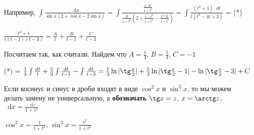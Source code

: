 \documentclass{article}
\newcommand*\diff{\mathop{}\!\mathrm{d}}
\begin{document}
\hfill

Например, $\int \frac{\diff x}{\sin x (2 + \cos x - 2 \sin x)} = \int \frac{\frac{2 \diff t}{1 + t^2}}{\frac{2t}{1 + t^2} (2 + \frac{1 - t^2}{1 + t^2} - \frac{2 * 2 t}{1 + t^2})} = \int \frac{(t^2 + 1) \diff t}{t (t^2 - 4t + 3)}$ = (*)

$\frac{t^2 + 1}{t(t - 1)(t - 3)} = \frac{A}{t} + \frac{B}{t - 1} + \frac{C}{t - 3}$

Посчитаем так, как считали. Найдем что $A = \frac{1}{3}$, $B = \frac{5}{3}$, $C = -1$

(*) = $\frac{1}{3} \int \frac{\diff t}{t} + \frac{5}{3} \int \frac{\diff t}{t - 1} - \int \frac{\diff t}{t - 3} = \frac{1}{3} \ln |\tg \frac{x}{2}| + \frac{5}{3} \ln |\tg \frac{x}{2} - 1| - \ln |\tg \frac{x}{2} - 3| + C$

\hfill

Если косинус и синус в дроби входят в виде $\cos^2 x$ и $\sin^2 x$, то мы можем делать замену не универсальную, а \textbf{обозначать} $\tg x = z$, $x = \arctg z$, $\diff x = \frac{\diff z}{1 + z^2}$

$\cos^2 x = \frac{1}{1 + t^2}$, $\sin^2 x = \frac{t^2}{1 + t^2}$
\end{document}
